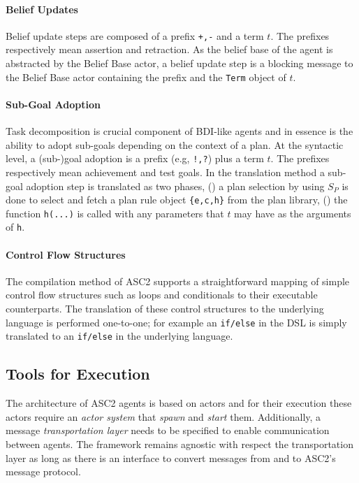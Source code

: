 \paragraph{Belief Updates}
Belief update steps are composed of a prefix \verb|+,-| and a term $t$. The prefixes respectively mean assertion and retraction. As the belief base of the agent is abstracted by the Belief Base actor, a belief update step is a blocking message to the Belief Base actor containing the prefix and the \verb+Term+ object of $t$.

\paragraph{Sub-Goal Adoption}
Task decomposition is crucial component of BDI-like agents and in essence is the ability to adopt sub-goals depending on the context of a plan. At the syntactic level, a (sub-)goal adoption is a prefix (e.g, \verb+!,?+) plus a term $t$. The prefixes respectively mean achievement and test goals. In the translation method a sub-goal adoption step is translated as two phases, () a plan selection by using $S_P$ is done to select and fetch a plan rule object \verb+{e,c,h}+ from the plan library, () the function \verb+h(...)+ is called with any parameters that $t$ may have as the arguments of \verb+h+.

\paragraph{Control Flow Structures}
The compilation method of ASC2 supports a  straightforward mapping of simple control flow structures such as loops and conditionals to their executable counterparts. The translation of these control structures to the underlying language is performed one-to-one; for example an \verb+if/else+ in the DSL is simply translated to an \verb+if/else+ in the underlying language.

\subsection{Tools for Execution}
The architecture of ASC2 agents is based on actors and for their execution these actors require an \textit{actor system} that \textit{spawn} and \textit{start} them. Additionally, a message \textit{transportation layer} needs to be specified to enable communication between agents. The framework remains agnostic with respect the transportation layer as long as there is an interface to convert messages from and to ASC2's message protocol.

